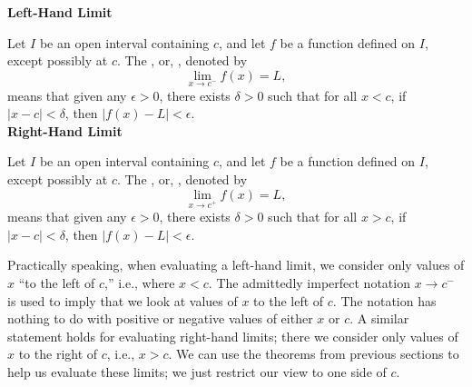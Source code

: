 %
\enlargethispage{1\baselineskip}
{\textbf{Left-Hand Limit} 

\indent Let $I$ be an open interval containing $c$, and let $f$ be a function defined on $I$, except possibly at $c$. 
The , or, , denoted by  
$$\displaystyle \lim_{x\rightarrow c^-} f(x) = L,$$
means that given any $\epsilon > 0$, there exists $\delta > 0$ such that for all $x< c$,  
if  $|x - c| < \delta$, then $|f(x) - L| < \epsilon$.\\

\textbf{Right-Hand Limit}

Let $I$ be an open interval containing $c$, and let $f$ be a function defined on $I$, except possibly at $c$. 
The , or, , denoted by  
$$\displaystyle \lim_{x\rightarrow c^+} f(x) = L,$$
means that given any $\epsilon > 0$, there exists $\delta > 0$ such that for all $x> c$,  
if  $|x - c| < \delta$, then $|f(x) - L| < \epsilon$.
}
\restoreboxwidth
\normalsize

Practically speaking, when evaluating a left-hand limit, we consider only values of $x$ ``to the left of $c$,'' i.e., where $x<c$. The admittedly imperfect notation $x\to c^-$ is used to imply that we look at values of $x$ to the left of $c$. The notation has nothing to do with positive or negative values of either $x$ or $c$. A similar statement holds for evaluating right-hand limits; there we consider only values of $x$ to the right of $c$, i.e., $x>c$. We can use the theorems from previous sections to help us evaluate these limits; we just restrict our view to one side of $c$.

